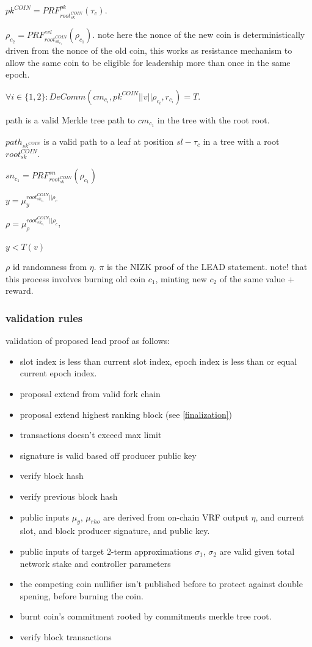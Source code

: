 \documentclass{article}
\begin{document}
 \item $pk^{COIN} = PRF_{root_{sk}^{COIN}}^{pk}(\tau_c)$.
 \item $\rho_{c_2}=PRF_{root_{sk_{c_1}}^{COIN}}^{evl}(\rho_{c_1})$.
 note here the nonce of the new coin is deterministically driven from the nonce of the old coin, this works as resistance mechanism to allow the same coin to be eligible for leadership more than once in the same epoch.
 \item $\forall i \in \{1,2\} : DeComm(cm_{c_i},pk^{COIN}||v||\rho_{c_i},r_{c_i})=T$.
 \item path is a valid Merkle tree path to $cm_{c_1}$ in the tree with the root root.
 \item $path_{sk^{COIN}}$ is a valid path to a leaf at position $sl-\tau_c$ in a tree with a root $root_{sk}^{COIN}$.
 \item $sn_{c_1}= PRF_{root_{sk}^{COIN}}^{sn}(\rho_{c_1})$
 \item $y = \mu_{y}^{root_{sk_{c_1}}^{COIN}||\rho_c}$
 \item $\rho = \mu_{\rho}^{root_{sk_{c_1}}^{COIN}||\rho_c}$,

 \item $y< T(v)$

   $\rho$ id randomness from $\eta$.  $\pi$ is the NIZK proof of the LEAD statement.
   note! that this process involves burning old coin $c_1$, minting new  $c_2$ of the same value + reward.


\subsubsection{ validation rules}

validation of proposed lead proof as follows:
\begin{itemize}
\item slot index is less than current slot index, epoch index is less than or equal current epoch index.
\item proposal extend from valid fork chain
\item proposal extend highest ranking block (see \ref{finalization})
\item transactions doesn't exceed max limit
\item signature is valid based off producer public key
\item verify block hash
\item verify previous block hash
\item public inputs $\mu_y$, $\mu_{rho}$ are derived from on-chain VRF output $\eta$, and current slot, and block producer signature, and public key.
\item public inputs of target 2-term approximations $\sigma_1$, $\sigma_2$ are valid given total network stake and controller parameters
\item the competing coin nullifier isn't published before to protect against double spening, before burning the coin.
\item burnt coin's commitment rooted by commitments merkle tree root.
\item verify block transactions

\end{itemize}
\end{document}
